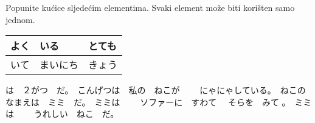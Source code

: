 	\vspace{10pt}
	
	\begin{mondai}{Popunite kućice sljedećim elementima. Svaki element može biti korišten samo jednom. }

		\item 
	\begin{tabular}{|l|l|l|}
		\hline
		よく&いる&とても\\\hline
		いて&まいにち&きょう\\\hline %
	\end{tabular}

	\end{mondai}

	\begin{bunshou}
		\framebox{ \begin{minipage}{0.4in}\hfill\vspace{0.3in}\end{minipage} }\vspace{10pt}は　２がつ　だ。　こんげつは　私の　ねこが　
		\framebox{ \begin{minipage}{0.4in}\hfill\vspace{0.3in}\end{minipage} }\vspace{10pt}
		　にゃにゃしている。　ねこの　なまえは　ミミ　だ。　ミミは　%
		\framebox{ \begin{minipage}{0.4in}\hfill\vspace{0.3in}\end{minipage} }\vspace{10pt}　ソファーに　すわて %
		\framebox{ \begin{minipage}{0.4in}\hfill\vspace{0.3in}\end{minipage} }\vspace{10pt}　そらを　みて
		\framebox{ \begin{minipage}{0.4in}\hfill\vspace{0.3in}\end{minipage} }\vspace{10pt}。　ミミは　
		\framebox{ \begin{minipage}{0.4in}\hfill\vspace{0.3in}\end{minipage} }\vspace{10pt}　うれしい　ねこ　だ。%
	\end{bunshou}
	